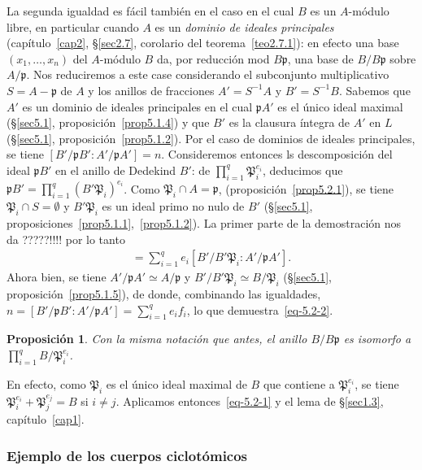 \documentclass[bibtotoc,leqno,spanish]{amsbook}
\newcommand{\idl}[1]{\mathfrak{#1}}
\numberwithin{equation}{section}
\theoremstyle{note}
\theoremstyle{note}
\newtheorem{proposition}{Proposici\'on}
\theoremstyle{rem}
\numberwithin{theorem}{section}
\numberwithin{proposition}{section}
\numberwithin{definition}{section}
\numberwithin{lemma}{section}
\numberwithin{corollary}{section}
\numberwithin{example}{section}
\numberwithin{footnote}{section}%
\begin{document}
La segunda igualdad es f\'acil tambi\'en en el caso en el cual $B$ es un $A$-m\'odulo libre, en particular cuando
$A$ es un {\em dominio de ideales principales}
(cap\'itulo~\ref{cap2}, \S\ref{sec2.7}, corolario del teorema~\ref{teo2.7.1}): en efecto una
base $(x_{1},\dots,x_{n})$ del $A$-m\'odulo $B$ da, por reducci\'on mod $B\idl{p}$, una base de $B/B\idl{p}$ sobre
$A/\idl{p}$. Nos reduciremos a este case considerando el subconjunto multiplicativo $S = A-\idl{p}$ de $A$ y
los anillos de fracciones $A' = S^{-1}A$ y $B' = S^{-1}B$. Sabemos que $A'$ es un dominio de ideales principales
en el cual $\idl{p}A'$ es el \'unico ideal maximal (\S\ref{sec5.1}, proposici\'on~\ref{prop5.1.4}) y que $B'$ es la clausura \'integra de $A'$ en $L$
(\S\ref{sec5.1}, proposici\'on~\ref{prop5.1.2}). Por el caso de dominios de ideales principales, se tiene $[B'/\idl{p}B':A'/\idl{p}A']=n$.
Consideremos entonces ls descomposici\'on del ideal $\idl{p}B'$ en el anillo de Dedekind $B'$:
de $\prod_{i=1}^{q}\idl{P}_{i}^{e_{i}}$, deducimos que $\idl{p}B' = \prod_{i=1}^{q}(B'\idl{P}_{i})^{e_{i}}$. Como
$\idl{P}_{i}\cap A=\idl{p}$, (proposici\'on~\ref{prop5.2.1}), se tiene $\idl{P}_{i}\cap S = \emptyset$ y $B'\idl{P}_{i}$ es un ideal primo
no nulo de $B'$ (\S\ref{sec5.1}, proposiciones~\ref{prop5.1.1},~\ref{prop5.1.2}). La primer parte de la demostraci\'on nos da ?????!!!! por lo tanto
\begin{gather*}
[B'/\idl{p}B':A'/\idl{p}A']=\sum_{i=1}^{q}e_{i}[B'/B'\idl{P}_{i}:A'/\idl{p}A'].
\end{gather*}
Ahora bien, se tiene $A'/\idl{p}A'\simeq A/\idl{p}$ y $B'/B'\idl{P}_{i}\simeq B/\idl{P}_{i}$ (\S\ref{sec5.1},
proposici\'on~\ref{prop5.1.5}),
de donde, combinando las igualdades, $n=[B'/\idl{p}B':A'/\idl{p}A']=\sum_{i=1}^{q}e_{i}f_{i}$, lo que
demuestra~\eqref{eq-5.2-2}.

\begin{proposition}\label{prop5.2.2}
Con la misma notaci\'on que antes, el anillo $B/B\idl{p}$ es isomorfo a $\prod_{i=1}^{q}B/\idl{P}_{i}^{e_{i}}$.
\end{proposition}

En efecto, como $\idl{P}_{i}$ es el \'unico ideal maximal de $B$ que contiene a $\idl{P}_{i}^{e_{i}}$, se tiene
$\idl{P}_{i}^{e_{i}}+\idl{P}_{j}^{e_{j}}=B$ si $i\neq j$. Aplicamos entonces~\eqref{eq-5.2-1} y el
lema de \S\ref{sec1.3}, cap\'itulo~\ref{cap1}.

\subsubsection*{Ejemplo de los cuerpos ciclot\'omicos}
\end{document}
